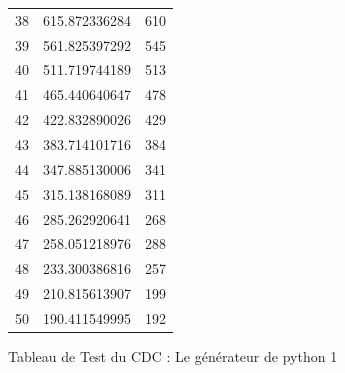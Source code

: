 \documentclass[10pt,a4paper]{article}
\begin{document}
\begin{figure}[h]
\begin{tabular}{|r|r|r|}
38 & 615.872336284 & 610\\
39 & 561.825397292 & 545\\
40 & 511.719744189 & 513\\
41 & 465.440640647 & 478\\
42 & 422.832890026 & 429\\
43 & 383.714101716 & 384\\
44 & 347.885130006 & 341\\
45 & 315.138168089 & 311\\
46 & 285.262920641 & 268\\
47 & 258.051218976 & 288\\
48 & 233.300386816 & 257\\
49 & 210.815613907 & 199\\
50 & 190.411549995 & 192\\
\hline
\end{tabular}
\caption{Tableau de Test du CDC : Le générateur de python 1}
\end{figure}
\end{document}
